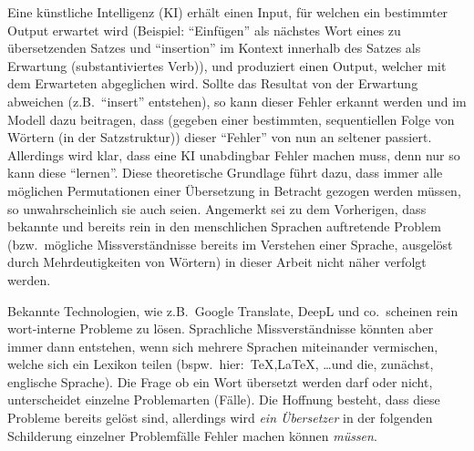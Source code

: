 Eine künstliche Intelligenz (KI) erhält einen Input, für welchen ein bestimmter Output erwartet wird (Beispiel: \enquote{Einfügen} als nächstes Wort eines zu übersetzenden Satzes und \enquote{insertion} im Kontext innerhalb des Satzes als Erwartung (substantiviertes Verb)), und produziert einen Output, welcher mit dem Erwarteten abgeglichen wird. Sollte das Resultat von der Erwartung abweichen (z.B.\ \enquote{insert} entstehen), so kann dieser Fehler erkannt werden und im Modell dazu beitragen, dass (gegeben einer bestimmten, sequentiellen Folge von Wörtern (in der Satzstruktur)) dieser \enquote{Fehler} von nun an seltener passiert. Allerdings wird klar, dass eine KI unabdingbar Fehler machen muss, denn nur so kann diese \enquote{lernen}. Diese theoretische Grundlage führt dazu, dass immer alle möglichen Permutationen einer Übersetzung in Betracht gezogen werden müssen, so unwahrscheinlich sie auch seien. Angemerkt sei zu dem Vorherigen, dass bekannte und bereits rein in den menschlichen Sprachen auftretende Problem (bzw.\ mögliche Missverständnisse bereits im Verstehen einer Sprache, ausgelöst durch Mehrdeutigkeiten von Wörtern) in dieser Arbeit nicht näher verfolgt werden.

Bekannte Technologien, wie z.B.\ Google Translate, DeepL und co.\ scheinen rein wort-interne Probleme zu lösen. Sprachliche Missverständnisse könnten aber immer dann entstehen, wenn sich mehrere Sprachen miteinander vermischen, welche sich ein Lexikon teilen (bspw.\ hier:\ \TeX{},\LaTeX{}, \ldots und die, zunächst, englische Sprache). Die Frage ob ein Wort übersetzt werden darf oder nicht, unterscheidet einzelne Problemarten (Fälle). Die Hoffnung besteht, dass diese Probleme bereits gelöst sind, allerdings wird \textit{ein Übersetzer} in der folgenden Schilderung einzelner Problemfälle Fehler machen können \textit{müssen}.






